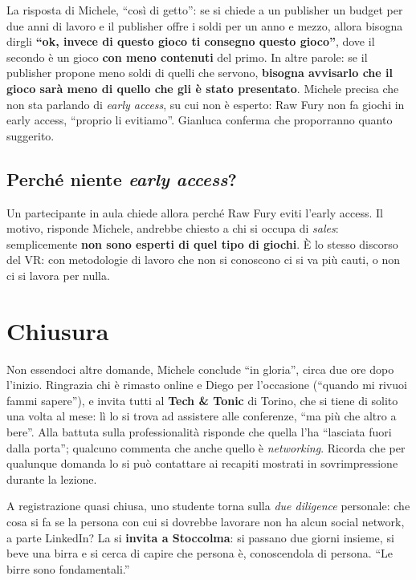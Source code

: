 La risposta di Michele, ``così di getto'': se si chiede a un publisher un budget
per due anni di lavoro e il publisher offre i soldi per un anno e mezzo, allora
bisogna dirgli \textbf{``ok, invece di questo gioco ti consegno questo gioco''},
dove il secondo è un gioco \textbf{con meno contenuti} del primo. In altre
parole: se il publisher propone meno soldi di quelli che servono,
\textbf{bisogna avvisarlo che il gioco sarà meno di quello che gli è stato
presentato}. Michele precisa che non sta parlando di \emph{early access}, su cui
non è esperto: Raw Fury non fa giochi in early access, ``proprio li evitiamo''.
Gianluca conferma che proporranno quanto suggerito.

\subsection{Perché niente \emph{early access}?}

Un partecipante in aula chiede allora perché Raw Fury eviti l'early access. Il
motivo, risponde Michele, andrebbe chiesto a chi si occupa di \emph{sales}:
semplicemente \textbf{non sono esperti di quel tipo di giochi}. È lo stesso
discorso del VR: con metodologie di lavoro che non si conoscono ci si va più
cauti, o non ci si lavora per nulla.

\section{Chiusura}
\label{sec:z4-chiusura}

Non essendoci altre domande, Michele conclude ``in gloria'', circa due ore dopo
l'inizio. Ringrazia chi è rimasto online e Diego per l'occasione (``quando mi
rivuoi fammi sapere''), e invita tutti al \textbf{Tech \& Tonic} di Torino, che
si tiene di solito una volta al mese: lì lo si trova ad assistere alle
conferenze, ``ma più che altro a bere''. Alla battuta sulla professionalità
risponde che quella l'ha ``lasciata fuori dalla porta''; qualcuno commenta che
anche quello è \emph{networking}. Ricorda che per qualunque domanda lo si può
contattare ai recapiti mostrati in sovrimpressione durante la lezione.

A registrazione quasi chiusa, uno studente torna sulla \emph{due diligence}
personale: che cosa si fa se la persona con cui si dovrebbe lavorare non ha
alcun social network, a parte LinkedIn? La si \textbf{invita a Stoccolma}: si
passano due giorni insieme, si beve una birra e si cerca di capire che persona
è, conoscendola di persona. ``Le birre sono fondamentali.''

